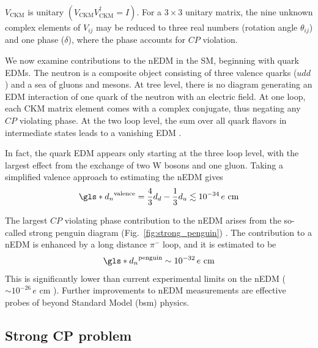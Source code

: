 $V_\text{CKM}$ is unitary $(V_\text{CKM}V_\text{CKM}^\dag=I)$. For a $3 \times 3$ unitary matrix, the nine unknown complex elements of $V_{ij}$ may be reduced to three real numbers (rotation angle $\theta_{ij}$) and one phase ($\delta$), where the phase accounts for $CP$ violation.

We now examine contributions to the nEDM in the SM, beginning with quark EDMs. The neutron is a composite object consisting of three valence quarks ($udd$) and a sea of gluons and mesons. At tree level, there is no diagram generating an EDM interaction of one quark of the neutron with an electric field. At one loop, each CKM matrix element comes with a complex conjugate, thus negating any $CP$ violating phase. At the two loop level, the sum over all quark flavors in intermediate states leads to a vanishing EDM \cite{schmidt-wellenburg_quest_2017, czarnecki2018}.

In fact, the quark EDM appears only starting at the three loop level, with the largest effect from the exchange of two W bosons and one gluon. Taking a simplified valence approach to estimating the nEDM gives \cite{czarnecki2018}
%
\begin{gather}
    \gls*{d_n}^\text{valence} = \frac{4}{3}d_d - \frac{1}{3}d_u \lesssim 10^{-34}\,e\text{ cm}
\end{gather}

The largest $CP$ violating phase contribution to the nEDM arises from the so-called strong penguin diagram (Fig.~\ref{fig:strong_penguin}) \cite{POS05}. The contribution to a nEDM is enhanced by a long distance $\pi^-$ loop, and it is estimated to be
%
\begin{gather}
    \gls*{d_n}^\text{penguin} \sim 10^{-32}\,e\text{ cm}
\end{gather}
%
This is significantly lower than current experimental limits on the nEDM ($\sim 10^{-26}\,e\text{ cm}$ \cite{ABE20}). Further improvements to nEDM measurements are effective probes of beyond Standard Model (\acrshort*{bsm}) physics.


\subsection{Strong CP problem}



